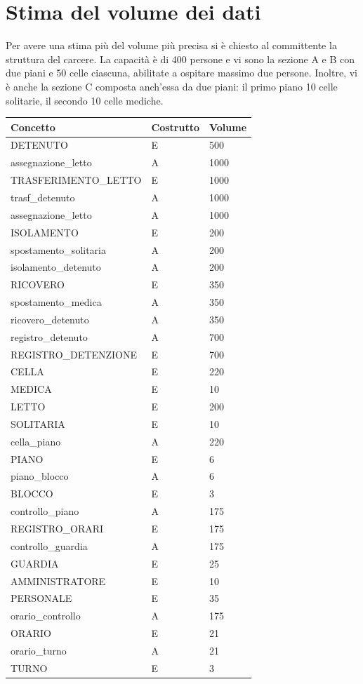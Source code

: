 \documentclass[a4paper,12pt]{report}
\begin{document}
\section{Stima del volume dei dati}
Per avere una stima più del volume più precisa si è chiesto al committente la struttura del carcere.
%
La capacità è di 400 persone e vi sono la sezione A e B con due piani e 50 celle ciascuna, abilitate a ospitare massimo due persone.
%
Inoltre, vi è anche la sezione C composta anch'essa da due piani: il primo piano 10 celle solitarie, il secondo 10 celle mediche.
%
\begin{table}[H]
\begin{tabular}{lll}
\hline
Concetto & Costrutto & Volume \\ \hline
DETENUTO & E & 500 \\
assegnazione\_letto & A &  1000 \\
TRASFERIMENTO\_LETTO & E &  1000 \\
trasf\_detenuto & A & 1000 \\
assegnazione\_letto & A & 1000 \\
ISOLAMENTO & E & 200\\
spostamento\_solitaria & A & 200\\
isolamento\_detenuto & A & 200 \\
RICOVERO & E & 350 \\
spostamento\_medica & A & 350 \\
ricovero\_detenuto & A & 350 \\
registro\_detenuto & A & 700 \\
REGISTRO\_DETENZIONE & E & 700 \\
CELLA & E & 220 \\
MEDICA & E & 10\\
LETTO & E & 200 \\
SOLITARIA & E & 10 \\
cella\_piano & A & 220 \\
PIANO & E & 6 \\
piano\_blocco & A & 6 \\
BLOCCO & E & 3 \\
controllo\_piano & A & 175 \\
REGISTRO\_ORARI & E & 175 \\
controllo\_guardia & A & 175 \\
GUARDIA & E & 25 \\
AMMINISTRATORE & E & 10 \\
PERSONALE & E & 35 \\
orario\_controllo & A & 175 \\
ORARIO & E & 21 \\
orario\_turno & A & 21 \\
TURNO & E & 3 \\
\end{tabular}
\end{table}
\end{document}
